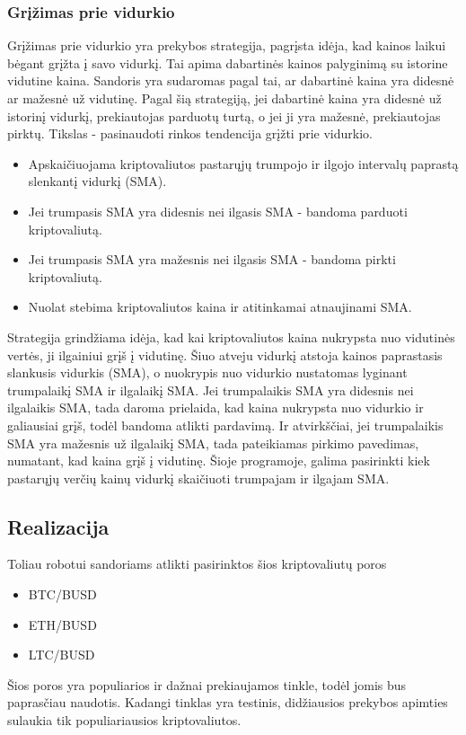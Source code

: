 \documentclass{VUMIFInfKursinis}
\begin{document}
\subsubsection{Grįžimas prie vidurkio}

Grįžimas prie vidurkio yra prekybos strategija, pagrįsta idėja, kad kainos laikui bėgant grįžta į savo vidurkį. 
Tai apima dabartinės kainos palyginimą su istorine vidutine kaina. Sandoris yra sudaromas pagal tai, ar dabartinė kaina yra didesnė ar mažesnė už vidutinę.
Pagal šią strategiją, jei dabartinė kaina yra didesnė už istorinį vidurkį, prekiautojas parduotų turtą, o jei ji yra mažesnė, prekiautojas pirktų. 
Tikslas - pasinaudoti rinkos tendencija grįžti prie vidurkio.

\begin {itemize}
\item Apskaičiuojama kriptovaliutos pastarųjų trumpojo ir ilgojo intervalų paprastą slenkantį vidurkį (SMA).
\item Jei trumpasis SMA yra didesnis nei ilgasis SMA - bandoma parduoti kriptovaliutą.
\item Jei trumpasis SMA yra mažesnis nei ilgasis SMA - bandoma pirkti kriptovaliutą.
\item Nuolat stebima kriptovaliutos kaina ir atitinkamai atnaujinami SMA.
\end {itemize}

Strategija grindžiama idėja, kad kai kriptovaliutos kaina nukrypsta nuo vidutinės vertės, ji ilgainiui grįš į vidutinę. Šiuo atveju vidurkį atstoja kainos paprastasis slankusis vidurkis (SMA),
o nuokrypis nuo vidurkio nustatomas lyginant trumpalaikį SMA ir ilgalaikį SMA. Jei trumpalaikis SMA yra didesnis nei ilgalaikis SMA, tada daroma prielaida, kad kaina nukrypsta nuo vidurkio
ir galiausiai grįš, todėl bandoma atlikti pardavimą. Ir atvirkščiai, jei trumpalaikis SMA yra mažesnis už ilgalaikį SMA, tada pateikiamas pirkimo pavedimas, numatant, kad kaina grįš į vidutinę.
Šioje programoje, galima pasirinkti kiek pastarųjų verčių kainų vidurkį skaičiuoti trumpajam ir ilgajam SMA.


\subsection{Realizacija}

Toliau robotui sandoriams atlikti pasirinktos šios kriptovaliutų poros 
\begin {itemize}
\item BTC/BUSD
\item ETH/BUSD
\item LTC/BUSD
\end {itemize}
Šios poros yra populiarios ir dažnai prekiaujamos tinkle, todėl jomis bus paprasčiau naudotis. Kadangi tinklas yra testinis, didžiausios prekybos apimties sulaukia
tik populiariausios kriptovaliutos.
\end{document}
